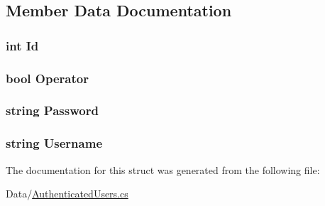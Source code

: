 \subsection{Member Data Documentation}
\hypertarget{structOTA_1_1Data_1_1UserDetails_afe0b47b3c92f2f69ea3da50cb72553eb}{}
\subsubsection[{Id}]{\setlength{\rightskip}{0pt plus 5cm}int Id}\label{structOTA_1_1Data_1_1UserDetails_afe0b47b3c92f2f69ea3da50cb72553eb}
\hypertarget{structOTA_1_1Data_1_1UserDetails_a787f68544bcb150abd250bd7379e2019}{}
\subsubsection[{Operator}]{\setlength{\rightskip}{0pt plus 5cm}bool Operator}\label{structOTA_1_1Data_1_1UserDetails_a787f68544bcb150abd250bd7379e2019}
\hypertarget{structOTA_1_1Data_1_1UserDetails_a9c7aae3a8518d5efd22e991b5944e0d4}{}
\subsubsection[{Password}]{\setlength{\rightskip}{0pt plus 5cm}string Password}\label{structOTA_1_1Data_1_1UserDetails_a9c7aae3a8518d5efd22e991b5944e0d4}
\hypertarget{structOTA_1_1Data_1_1UserDetails_acc7e2f953f8dbfceb1c5a3834b78e3f7}{}
\subsubsection[{Username}]{\setlength{\rightskip}{0pt plus 5cm}string Username}\label{structOTA_1_1Data_1_1UserDetails_acc7e2f953f8dbfceb1c5a3834b78e3f7}


The documentation for this struct was generated from the following file\+:\begin{DoxyCompactItemize}
\item 
Data/\hyperlink{AuthenticatedUsers_8cs}{Authenticated\+Users.\+cs}\end{DoxyCompactItemize}
